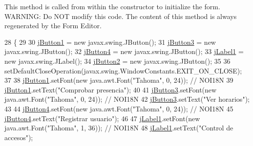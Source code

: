This method is called from within the constructor to initialize the form. W\+A\+R\+N\+I\+NG\+: Do N\+OT modify this code. The content of this method is always regenerated by the Form Editor. 
\begin{DoxyCode}
28                                   \{
29 
30         \mbox{\hyperlink{classinterfacessoguar_1_1cu1617_a50f641f67c27a9b417d476ee81a6d982}{jButton1}} = \textcolor{keyword}{new} javax.swing.JButton();
31         \mbox{\hyperlink{classinterfacessoguar_1_1cu1617_ab6bee6d7b3c436f015dc73e19b861fe4}{jButton3}} = \textcolor{keyword}{new} javax.swing.JButton();
32         \mbox{\hyperlink{classinterfacessoguar_1_1cu1617_a8a8f5dee729cb00cabe4a95e51011050}{jButton4}} = \textcolor{keyword}{new} javax.swing.JButton();
33         \mbox{\hyperlink{classinterfacessoguar_1_1cu1617_ae976dd2eb4ea08817085c2704c78c3ef}{jLabel1}} = \textcolor{keyword}{new} javax.swing.JLabel();
34         \mbox{\hyperlink{classinterfacessoguar_1_1cu1617_a47c3aa6c8836a1ff965ecef05f6d0e2f}{jButton2}} = \textcolor{keyword}{new} javax.swing.JButton();
35 
36         setDefaultCloseOperation(javax.swing.WindowConstants.EXIT\_ON\_CLOSE);
37 
38         \mbox{\hyperlink{classinterfacessoguar_1_1cu1617_a50f641f67c27a9b417d476ee81a6d982}{jButton1}}.setFont(\textcolor{keyword}{new} java.awt.Font(\textcolor{stringliteral}{"Tahoma"}, 0, 24)); \textcolor{comment}{// NOI18N}
39         \mbox{\hyperlink{classinterfacessoguar_1_1cu1617_a50f641f67c27a9b417d476ee81a6d982}{jButton1}}.setText(\textcolor{stringliteral}{"Comprobar presencia"});
40 
41         \mbox{\hyperlink{classinterfacessoguar_1_1cu1617_ab6bee6d7b3c436f015dc73e19b861fe4}{jButton3}}.setFont(\textcolor{keyword}{new} java.awt.Font(\textcolor{stringliteral}{"Tahoma"}, 0, 24)); \textcolor{comment}{// NOI18N}
42         \mbox{\hyperlink{classinterfacessoguar_1_1cu1617_ab6bee6d7b3c436f015dc73e19b861fe4}{jButton3}}.setText(\textcolor{stringliteral}{"Ver horarios"});
43 
44         \mbox{\hyperlink{classinterfacessoguar_1_1cu1617_a8a8f5dee729cb00cabe4a95e51011050}{jButton4}}.setFont(\textcolor{keyword}{new} java.awt.Font(\textcolor{stringliteral}{"Tahoma"}, 0, 24)); \textcolor{comment}{// NOI18N}
45         \mbox{\hyperlink{classinterfacessoguar_1_1cu1617_a8a8f5dee729cb00cabe4a95e51011050}{jButton4}}.setText(\textcolor{stringliteral}{"Registrar usuario"});
46 
47         \mbox{\hyperlink{classinterfacessoguar_1_1cu1617_ae976dd2eb4ea08817085c2704c78c3ef}{jLabel1}}.setFont(\textcolor{keyword}{new} java.awt.Font(\textcolor{stringliteral}{"Tahoma"}, 1, 36)); \textcolor{comment}{// NOI18N}
48         \mbox{\hyperlink{classinterfacessoguar_1_1cu1617_ae976dd2eb4ea08817085c2704c78c3ef}{jLabel1}}.setText(\textcolor{stringliteral}{"Control de accesos"});

\end{DoxyCode}
